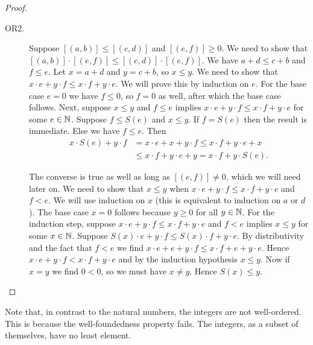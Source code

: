 \documentclass[../main.tex]{subfiles}
\begin{document}
\begin{proof}
\begin{description}
        \item[OR2.] Suppose $[(a,b)]\leq[(c,d)]$ and $[(e,f)]\geq0$. We need to show that $[(a,b)]\cdot[(e,f)]\leq[(c,d)]\cdot[(e,f)]$. We have $a+d\leq c+b$ and $f\leq e$. Let $x=a+d$ and $y=c+b$, so $x\leq y$. We need to show that $x\cdot e+y\cdot f\leq x\cdot f+y\cdot e$. We will prove this by induction on $e$. For the base case $e=0$ we have $f\leq0$, so $f=0$ as well, after which the base case follows. Next, suppose $x\leq y$ and $f\leq e$ implies $x\cdot e+y\cdot f\leq x\cdot f+y\cdot e$ for some $e\in\mathbb{N}$. Suppose $f\leq S(e)$ and $x\leq y$. If $f=S(e)$ then the result is immediate. Else we have $f\leq e$. Then
        \begin{align*}
            x\cdot S(e)+y\cdot f & =x\cdot e+x+y\cdot f\leq x\cdot f+y\cdot e+x \\
            & \leq x\cdot f+y\cdot e+y=x\cdot f+y\cdot S(e).
        \end{align*}

        The converse is true as well as long as $[(e,f)]\neq0$, which we will need later on. We need to show that $x\leq y$ when $x\cdot e+y\cdot f\leq x\cdot f+y\cdot e$ and $f<e$. We will use induction on $x$ (this is equivalent to induction on $a$ or $d$). The base case $x=0$ follows because $y\geq0$ for all $y\in\mathbb{N}$. For the induction step, suppose $x\cdot e+y\cdot f\leq x\cdot f+y\cdot e$ and $f<e$ implies $x\leq y$ for some $x\in\mathbb{N}$. Suppose $S(x)\cdot e+y\cdot f\leq S(x)\cdot f+y\cdot e$. By distributivity and the fact that $f<e$ we find $x\cdot e+e+y\cdot f\leq x\cdot f+e+y\cdot e$. Hence $x\cdot e+y\cdot f<x\cdot f+y\cdot e$ and by the induction hypothesis $x\leq y$. Now if $x=y$ we find $0<0$, so we must have $x\neq y$. Hence $S(x)\leq y$.
    \end{description}
\end{proof}
Note that, in contrast to the natural numbers, the integers are not well-ordered. This is because the well-foundedness property fails. The integers, as a subset of themselves, have no least element.
\end{document}
